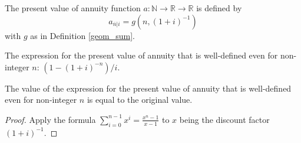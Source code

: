 \begin{definition}\label{a}
	\leanok
	The present value of annuity function $a : \mathbb N \to \mathbb R \to \mathbb R$
	is defined by
	\[
		a_{\overline n|i}=g(n, (1 + i)^{-1})
	\] with $g$ as in Definition \ref{geom_sum}.
\end{definition}

\begin{definition}\label{a_formula}
	\leanok
	The expression for the present value of annuity
	that is well-defined even for non-integer $n$:
	$(1 - (1+i)^{-n}) / i$.
\end{definition}

\begin{lemma}\label{a_eq_a_formula}
	\leanok
	The value of the expression for the present value of annuity
	that is well-defined even for non-integer $n$
	is equal to the original value.
\end{lemma}
\begin{proof}
	\leanok
	Apply the formula $\sum_{i=0}^{n-1} x^i = \frac{x^n - 1}{x - 1}$ to $x$
	being the discount factor $(1+i)^{-1}$.
\end{proof}



